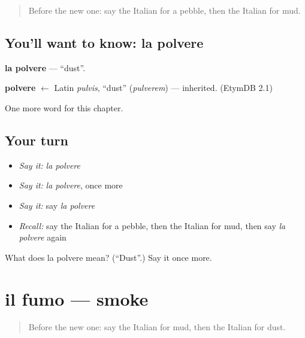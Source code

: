 \label{lesson:IT-C229-polvere}



\begin{quote}
Before the new one: say the Italian for a pebble, then the Italian for mud.
\end{quote}

\subsection*{You'll want to know: la polvere}
\textbf{la polvere} — \textquotedblleft{}dust\textquotedblright{}.

\begin{cousinweb}
\textbf{polvere} $\leftarrow$ Latin \emph{pulvis}, \textquotedblleft{}dust\textquotedblright{} (\emph{pulverem}) — inherited. (EtymDB 2.1)
\end{cousinweb}

\begin{grammarlens}[title={What you've built}]
One more word for this chapter.
\end{grammarlens}

\subsection*{Your turn}
\begin{itemize}
\raggedright
  \item \emph{Say it:} \emph{la polvere}
  \item \emph{Say it:} \emph{la polvere}, once more
  \item \emph{Say it:} say \emph{la polvere}
  \item \emph{Recall:} say the Italian for a pebble, then the Italian for mud, then say \emph{la polvere} again
\end{itemize}

\begin{tcolorbox}[breakable,colback=teal!4,colframe=teal!35!black,title={Before you move on}]
What does la polvere mean? (\textquotedblleft{}Dust\textquotedblright{}.) Say it once more.
\end{tcolorbox}
\section[il fumo]{il fumo — smoke}

\label{lesson:IT-C229-fumo}



\begin{quote}
Before the new one: say the Italian for mud, then the Italian for dust.
\end{quote}

